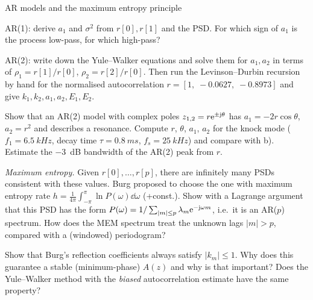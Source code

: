 \begin{exercise}{AR models and the maximum entropy principle}{\Paper}
\begin{tasks}
  \item AR(1): derive $a_1$ and $\sigma^2$ from $r[0],r[1]$ and the PSD. For which
    sign of $a_1$ is the process low-pass, for which high-pass?
  \item AR(2): write down the Yule--Walker equations and solve them for $a_1,a_2$
    in terms of $\rho_1=r[1]/r[0]$, $\rho_2=r[2]/r[0]$. Then run the Levinson--Durbin
    recursion by hand for the normalised autocorrelation
    $r=[1,\;-0.0627,\;-0.8973]$ and give $k_1,k_2,a_1,a_2,E_1,E_2$.
  \item Show that an AR(2) model with complex poles $z_{1,2}=r\mathrm{e}^{\pm\mathrm{j}\theta}$ has
    $a_1=-2r\cos\theta$, $a_2=r^2$ and describes a resonance. Compute $r$, $\theta$,
    $a_1$, $a_2$ for the knock mode ($f_1=\SI{6.5}{kHz}$, decay time
    $\tau=\SI{0.8}{ms}$, $f_s=\SI{25}{kHz}$) and compare with b). Estimate the
    \SI{-3}{dB} bandwidth of the AR(2) peak from $r$.
  \item \emph{Maximum entropy.} Given $r[0],\dots,r[p]$, there are infinitely many
    PSDs consistent with these values. Burg proposed to choose the one with maximum
    entropy rate $h=\frac{1}{4\pi}\int_{-\pi}^{\pi}\ln P(\omega)\dd\omega$
    (+const.). Show with a Lagrange argument that this PSD has the form
    $P(\omega)=1/\sum_{|m|\le p}\lambda_m\mathrm{e}^{-\mathrm{j}\omega m}$, i.e.\ it is an
    AR($p$) spectrum. How does the MEM spectrum treat the unknown lags $|m|>p$,
    compared with a (windowed) periodogram?
  \item Show that Burg's reflection coefficients always satisfy $|k_m|\le1$.
    Why does this guarantee a stable (minimum-phase) $A(z)$ and why is that
    important? Does the Yule--Walker method with the \emph{biased}
    autocorrelation estimate have the same property?
\end{tasks}
\end{exercise}

